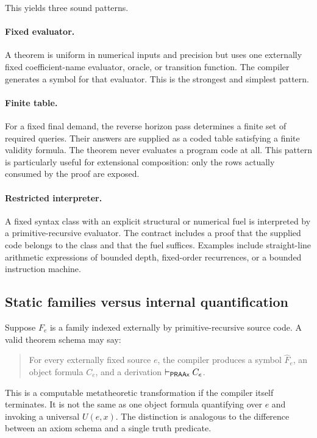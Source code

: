 This yields three sound patterns.

\paragraph{Fixed evaluator.}
A theorem is uniform in numerical inputs and precision but uses one externally fixed
coefficient-name evaluator, oracle, or transition function.  The compiler generates a
symbol for that evaluator.  This is the strongest and simplest pattern.

\paragraph{Finite table.}
For a fixed final demand, the reverse horizon pass determines a finite set of required
queries.  Their answers are supplied as a coded table satisfying a finite validity
formula.  The theorem never evaluates a program code at all.  This pattern is
particularly useful for extensional composition: only the rows actually consumed by
the proof are exposed.

\paragraph{Restricted interpreter.}
A fixed syntax class with an explicit structural or numerical fuel is interpreted by a
primitive-recursive evaluator.  The contract includes a proof that the supplied code
belongs to the class and that the fuel suffices.  Examples include straight-line
arithmetic expressions of bounded depth, fixed-order recurrences, or a bounded
instruction machine.

\subsection{Static families versus internal quantification}

Suppose \(F_e\) is a family indexed externally by primitive-recursive source code.  A
valid theorem schema may say:

\begin{quote}
For every externally fixed source \(e\), the compiler produces a symbol
\(\widehat F_e\), an object formula \(C_e\), and a derivation
\(\vdash_{\mathsf{PRAAx}} C_e\).
\end{quote}

This is a computable metatheoretic transformation if the compiler itself terminates.
It is not the same as one object formula quantifying over \(e\) and invoking a universal
\(U(e,x)\).  The distinction is analogous to the difference between an axiom schema
and a single truth predicate.

